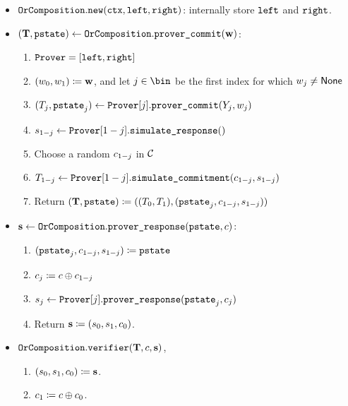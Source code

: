 \documentclass[11pt]{article}
\begin{document}
\begin{itemize}
  \item
  $\texttt{OrComposition}.\texttt{new}(\texttt{ctx}, \texttt{left}, \texttt{right})$: internally store $\texttt{left}$ and $\texttt{right}$.
  \item
  $(\mathbf {T}, \texttt{pstate})\gets \texttt{OrComposition}.\texttt{prover\_commit}(\mathbf {w})$:
    \begin{enumerate}
      \item $\texttt{Prover} = [\texttt{left}, \texttt{right}]$
      \item
        $(w_0,w_1)\coloneqq \mathbf {w}$, and let $j \in \bin$ be the first index for which $w_{j}\neq\mathsf{None}$
      \item
        $(T_j,\texttt{pstate}_j)\gets\texttt{Prover}[j].\texttt{prover\_commit}(Y_j,w_j)$
      \item
			   $s_{1-j}\gets\texttt{Prover}[1-j].\texttt{simulate\_response}()$
			\item
        Choose a random $c_{1-j}$ in $\mathcal{C}$
      \item
        $T_{1-j}\gets\texttt{Prover}[1-j].\texttt{simulate\_commitment}(c_{1-j},s_{1-j})$
      \item
	Return $(\mathbf {T},\texttt{pstate}) \coloneqq ((T_0,T_1),(\texttt{pstate}_j,c_{1-j},s_{1-j}))$
    \end{enumerate}
  \item
  $\mathbf {s} \gets \texttt{OrComposition}.\texttt{prover\_response}(\texttt{pstate}, c)$:
    \begin{enumerate}
      \item  $(\texttt{pstate}_j,c_{1-j},s_{1-j})\coloneqq\texttt{pstate}$
      \item
         $c_j\coloneqq c\oplus c_{1-j}$
         \item $s_j\gets\texttt{Prover}[j].\texttt{prover\_response}(\texttt{pstate}_j, c_j)$
      \item
        Return $\mathbf {s}\coloneqq(s_0,s_1, c_0)$.
    \end{enumerate}
  \item
  $\texttt{OrComposition}.\texttt{verifier}(\mathbf {T}, c, \mathbf {s})$,
    \begin{enumerate}
      \item
         $(s_0, s_1, c_0)\coloneqq \mathbf {s}$.
      \item
         $c_1\coloneqq c \oplus c_0$.

\end{enumerate}
\end{itemize}
\end{document}

